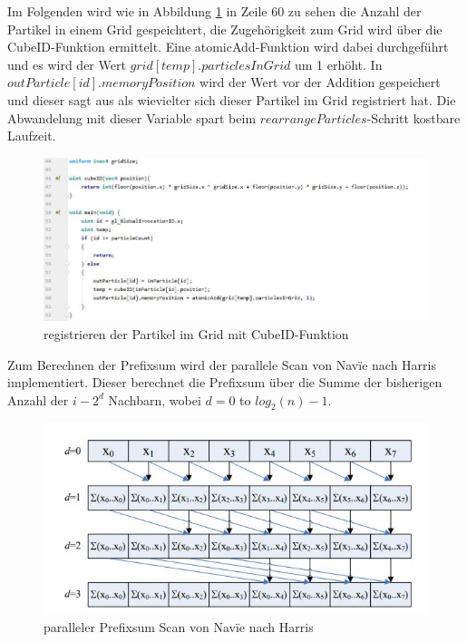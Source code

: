\documentclass[intern,palatino]{cgBA}
\begin{document}
Im Folgenden wird wie in Abbildung \ref{img:lable} in Zeile 60 zu sehen die Anzahl der Partikel in einem Grid gespeichtert, die Zugehörigkeit zum Grid wird über die CubeID-Funktion ermittelt. Eine atomicAdd-Funktion wird dabei durchgeführt und es wird der Wert $grid[temp].particlesInGrid$ um 1 erhöht. In $outParticle[id].memoryPosition$ wird der Wert vor der Addition gespeichert und dieser sagt aus als wievielter sich dieser Partikel im Grid registriert hat. Die Abwandelung mit dieser Variable spart beim $rearrange Particles$-Schritt kostbare Laufzeit.

\begin{figure}[H]
	\centering
	\includegraphics[width=1.3\columnwidth]{Bilder/lable.jpg}
	\caption{registrieren der Partikel im Grid mit CubeID-Funktion }
	\label{img:lable}
\end{figure}

Zum Berechnen der Prefixsum wird der parallele Scan von Nav\"{i}e nach Harris \cite{harris2007parallel} implementiert. Dieser berechnet die Prefixsum über die Summe der bisherigen Anzahl der $i - 2^d$ Nachbarn, wobei $d = 0$ to $log_2(n)-1$.

\begin{figure}[H]
	\centering
	\includegraphics[width=1.0\columnwidth]{Bilder/PrefixSum.jpg}
	\caption{paralleler Prefixsum Scan von Nav\"{i}e nach Harris \cite{harris2007parallel}}
	\label{img:prefixsum}
\end{figure}
\end{document}
